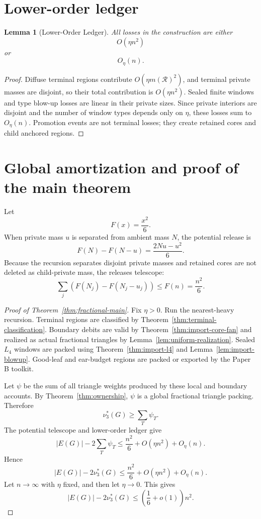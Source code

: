 \documentclass[11pt]{article}
\newtheorem{lemma}[theorem]{Lemma}
\theoremstyle{definition}
\newcommand{\calR}{\mathcal R}
\begin{document}
\section{Lower-order ledger}

\begin{lemma}[Lower-Order Ledger]\label{lem:lower-order}
All losses in the construction are either
\[
    O(\eta n^2)
\]
or
\[
    O_\eta(n).
\]
\end{lemma}

\begin{proof}
Diffuse terminal regions contribute \(O(\eta m(\calR)^2)\), and terminal private masses are disjoint, so their total contribution is \(O(\eta n^2)\). Sealed finite windows and type blow-up losses are linear in their private sizes. Since private interiors are disjoint and the number of window types depends only on \(\eta\), these losses sum to \(O_\eta(n)\). Promotion events are not terminal losses; they create retained cores and child anchored regions.
\end{proof}

\section{Global amortization and proof of the main theorem}

Let
\[
    F(x)=\frac{x^2}{6}.
\]
When private mass \(u\) is separated from ambient mass \(N\), the potential release is
\[
    F(N)-F(N-u)
    =
    \frac{2Nu-u^2}{6}.
\]
Because the recursion separates disjoint private masses and retained cores are not deleted as child-private mass, the releases telescope:
\[
    \sum_j
    \left(F(N_j)-F(N_j-u_j)\right)
    \le
    F(n)=\frac{n^2}{6}.
\]

\begin{proof}[Proof of Theorem~\ref{thm:fractional-main}]
Fix \(\eta>0\). Run the nearest-heavy recursion. Terminal regions are classified by Theorem~\ref{thm:terminal-classification}. Boundary debits are valid by Theorem~\ref{thm:import-core-fan} and realized as actual fractional triangles by Lemma~\ref{lem:uniform-realization}. Sealed \(L_4\) windows are packed using Theorem~\ref{thm:import-l4} and Lemma~\ref{lem:import-blowup}. Good-leaf and ear-budget regions are packed or exported by the Paper B toolkit.

Let \(\psi\) be the sum of all triangle weights produced by these local and boundary accounts. By Theorem~\ref{thm:ownership}, \(\psi\) is a global fractional triangle packing. Therefore
\[
    \nu_3^*(G)\ge \sum_T\psi_T.
\]
The potential telescope and lower-order ledger give
\[
    |E(G)|-2\sum_T\psi_T
    \le
    \frac{n^2}{6}
    +
    O(\eta n^2)
    +
    O_\eta(n).
\]
Hence
\[
    |E(G)|-2\nu_3^*(G)
    \le
    \frac{n^2}{6}
    +
    O(\eta n^2)
    +
    O_\eta(n).
\]
Let \(n\to\infty\) with \(\eta\) fixed, and then let \(\eta\to0\). This gives
\[
    |E(G)|-2\nu_3^*(G)
    \le
    \left(\frac16+o(1)\right)n^2.
\]
\end{proof}
\end{document}
